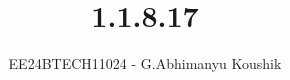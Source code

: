 \documentclass[journal]{IEEEtran}
\begin{document}

\vspace{3cm}

\title{1.1.8.17}
\author{EE24BTECH11024 - G.Abhimanyu Koushik}
{\let\newpage\relax\maketitle}

\renewcommand{\thefigure}{\theenumi}
\renewcommand{\thetable}{\theenumi}
\setlength{\intextsep}{10pt} %


\renewcommand{\thetable}{\theenumi}
\end{document}
